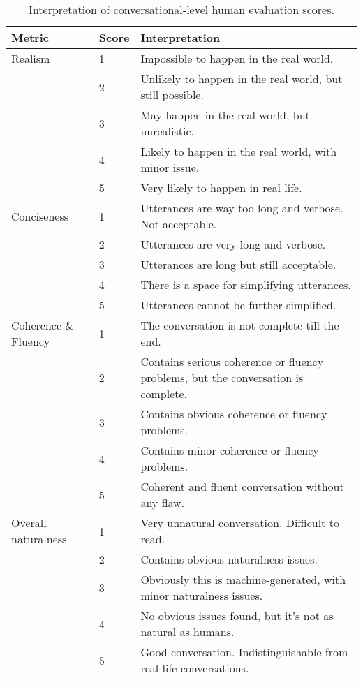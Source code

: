 
\begin{table*}[t]
\small
\centering
\begin{tabular}{lll}
\hline
\textbf{Metric} & \textbf{Score} & \textbf{Interpretation} \\ \hline
Realism & 1 & Impossible to happen in the real world. \\
& 2 & Unlikely to happen in the real world, but still possible. \\
& 3 & May happen in the real world, but unrealistic. \\
& 4 & Likely to happen in the real world, with minor issue. \\
& 5 & Very likely to happen in real life. \\ \hline
Conciseness & 1 & Utterances are way too long and verbose. Not acceptable. \\
& 2 & Utterances are very long and verbose. \\
& 3 & Utterances are long but still acceptable. \\
& 4 & There is a space for simplifying utterances. \\
& 5 & Utterances cannot be further simplified. \\ \hline
Coherence \& Fluency & 1 & The conversation is not complete till the end. \\
& 2 & Contains serious coherence or fluency problems, but the conversation is complete.\\
& 3 & Contains obvious coherence or fluency problems. \\
& 4 & Contains minor coherence or fluency problems. \\
& 5 & Coherent and fluent conversation without any flaw. \\ \hline
Overall naturalness & 1 & Very unnatural conversation. Difficult to read. \\
& 2 & Contains obvious naturalness issues. \\
& 3 & Obviously this is machine-generated, with minor naturalness issues. \\
& 4 & No obvious issues found, but it's not as natural as humans. \\
& 5 & Good conversation. Indistinguishable from real-life conversations. \\
\hline

\end{tabular}

\caption{Interpretation of conversational-level human evaluation scores.}
\label{tab:score_interpretation}
\end{table*}


